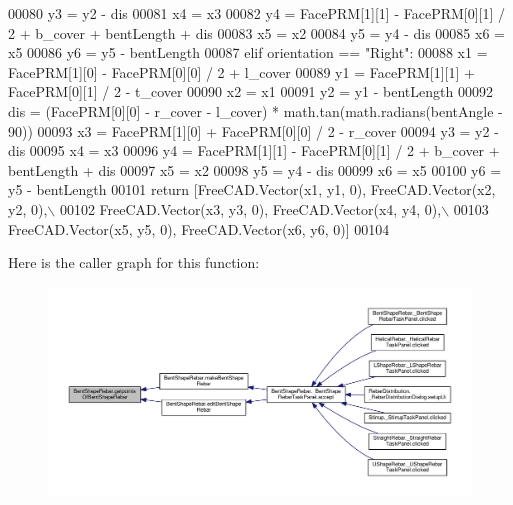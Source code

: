 \begin{DoxyCode}
00080         y3 = y2 - dis
00081         x4 = x3
00082         y4 = FacePRM[1][1] - FacePRM[0][1] / 2 + b\_cover + bentLength + dis
00083         x5 = x2
00084         y5 = y4 - dis
00085         x6 = x5
00086         y6 = y5 - bentLength
00087     \textcolor{keywordflow}{elif} orientation == \textcolor{stringliteral}{"Right"}:
00088         x1 = FacePRM[1][0] - FacePRM[0][0] / 2 + l\_cover
00089         y1 = FacePRM[1][1] + FacePRM[0][1] / 2 - t\_cover
00090         x2 = x1
00091         y2 = y1 - bentLength
00092         dis = (FacePRM[0][0] - r\_cover - l\_cover) * math.tan(math.radians(bentAngle - 90))
00093         x3 = FacePRM[1][0] + FacePRM[0][0] / 2 - r\_cover
00094         y3 = y2 - dis
00095         x4 = x3
00096         y4 = FacePRM[1][1] - FacePRM[0][1] / 2 + b\_cover + bentLength + dis
00097         x5 = x2
00098         y5 = y4 - dis
00099         x6 = x5
00100         y6 = y5 - bentLength
00101     \textcolor{keywordflow}{return} [FreeCAD.Vector(x1, y1, 0), FreeCAD.Vector(x2, y2, 0),\(\backslash\)
00102            FreeCAD.Vector(x3, y3, 0), FreeCAD.Vector(x4, y4, 0),\(\backslash\)
00103            FreeCAD.Vector(x5, y5, 0), FreeCAD.Vector(x6, y6, 0)]
00104 
\end{DoxyCode}


Here is the caller graph for this function\+:\nopagebreak
\begin{figure}[H]
\begin{center}
\leavevmode
\includegraphics[width=350pt]{namespaceBentShapeRebar_a33951a8ab21a73bae42af9f81d7c43c3_icgraph}
\end{center}
\end{figure}



